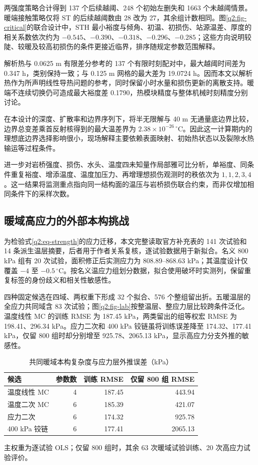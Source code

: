 两强度策略合计得到 137 个后续越阈、248 个初始左删失和 1663 个未越阈情景。暖端接触策略仅将 ST 的后续越阈数由 28 改为 27，其余组计数相同。图\ref{q2:fig-critical}的联合设计中，STH 最小裕度与倾角、初温、初损伤、站源温差、厚度的相关系数依次约为 $-0.545$、$-0.390$、$-0.318$、$-0.296$、$-0.285$；这些方向说明较陡、较暖及较高初损伤的条件更接近临界，排序随规定参数范围解释。

解析热与 0.0625 m 有限差分参考的 137 个有限时刻配对中，最大越阈时间差为 0.347 h，类别保持一致；与 0.125 m 网格的最大差为 19.0724 h。因而本文以解析热作为所声明线性导热问题的参考，同时保留小时水量和损伤更新的离散支持。暖端不连续切换仍可造成最大裕度差 0.1790，热模块精度与整体机械时刻精度分别讨论。

在本设计的深度、扩散率和边界序列下，将半无限解与 40 m 无通量底边界比较，边界总变差乘首反射核得到的最大温差界为 $2.38\times10^{-26}\,^{\circ}\mathrm C$。因此这一计算期内的理想底边界选择影响很小，现场解释主要依赖表面映射、初始热状态以及裂隙水热输运等过程条件。

进一步对岩桥强度、损伤、水头、温度四未知量作局部雅可比分析，单裕度、同条件重复裕度、增添温度、温度加压力、再增理想损伤观测时的秩依次为 $1,1,2,3,4$。这一结果将监测重点指向同一结构面的温压与岩桥损伤联合约束，而非仅增加相同条件下的采样次数。

\subsection{暖域高应力的外部本构挑战}\label{q2:sec-laboratory}

为检验式\eqref{q2:eq-strength}的应力迁移，本文完整读取官方补充表的 141 次试验和 14 条派生温层摘要，后者用于作者关系复核，逐试验数据用于新拟合。名义 800 kPa 组有 20 次试验，面积修正后实测应力为 808.89--868.63 kPa；其温度设计仅覆盖 $-4$ 至 $-0.5\,^{\circ}\mathrm C$。按名义温应力组划分数据，拟合使用破坏时实测列，保留重复标签的身份歧义和相关性敏感性。

四种固定候选在四域、两权重下形成 32 个拟合、576 个整组留出折。五暖温层的全应力共同域含 83 次试验；图\ref{q2:fig-lab}按整温层、整应力层比较跨条件泛化。温度线性 MC 的训练 RMSE 为 187.45 kPa，两类留出的组等权宏 RMSE 为 198.41、296.34 kPa。应力二次和 400 kPa 铰链虽将训练误差降至 174.32、177.41 kPa，仅留 800 组时却分别增至 925.78、2065.13 kPa，显示高应力分支外推的敏感性。

\begin{table}[htbp]
\centering\small
\caption{共同暖域本构复杂度与应力层外推误差（kPa）}
\label{q2:tab-lab}
\begin{tabular}{@{}lrrr@{}}
\toprule
候选 & 参数数 & 训练 RMSE & 仅留 800 组 RMSE\\
\midrule
温度线性 MC & 4 & 187.45 & 443.94\\
温度二次 MC & 6 & 185.39 & 421.07\\
应力二次 & 6 & 174.32 & 925.78\\
400 kPa 铰链 & 6 & 177.41 & 2065.13\\
\bottomrule
\end{tabular}
\par\smallskip\footnotesize 主权重为逐试验 OLS；仅留 800 组时，其余 63 次暖域试验训练、20 次高应力试验评价。
\end{table}

